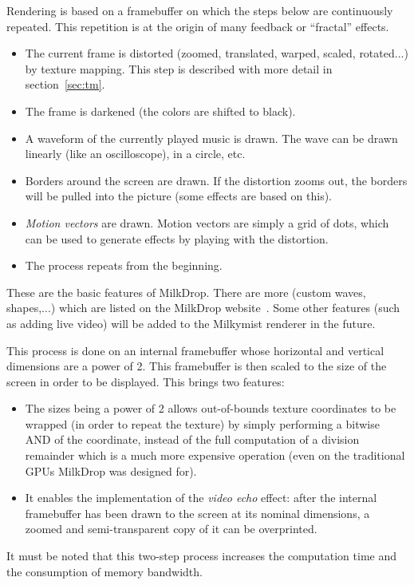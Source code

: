 \documentclass[a4paper,11pt]{kthesis}
\begin{document}
Rendering is based on a framebuffer on which the steps below are continuously repeated. This repetition is at the origin of many feedback or ``fractal'' effects.
\begin{itemize}
\item The current frame is distorted (zoomed, translated, warped, scaled, rotated...) by texture mapping. This step is described with more detail in section~\ref{sec:tm}.
\item The frame is darkened (the colors are shifted to black).
\item A waveform of the currently played music is drawn. The wave can be drawn linearly (like an oscilloscope), in a circle, etc.
\item Borders around the screen are drawn. If the distortion zooms out, the borders will be pulled into the picture (some effects are based on this).
\item \textit{Motion vectors} are drawn. Motion vectors are simply a grid of dots, which can be used to generate effects by playing with the distortion.
\item The process repeats from the beginning.
\end{itemize}

These are the basic features of MilkDrop. There are more (custom waves, shapes,...) which are listed on the MilkDrop website~\cite{milkdrop}. Some other features (such as adding live video) will be added to the Milkymist renderer in the future.

This process is done on an internal framebuffer whose horizontal and vertical dimensions are a power of 2. This framebuffer is then scaled to the size of the screen in order to be displayed. This brings two features:
\begin{itemize}
\item The sizes being a power of 2 allows out-of-bounds texture coordinates to be wrapped (in order to repeat the texture) by simply performing a bitwise AND of the coordinate, instead of the full computation of a division remainder which is a much more expensive operation (even on the traditional GPUs MilkDrop was designed for).
\item It enables the implementation of the \textit{video echo} effect: after the internal framebuffer has been drawn to the screen at its nominal dimensions, a zoomed and semi-transparent copy of it can be overprinted.
\end{itemize}
It must be noted that this two-step process increases the computation time and the consumption of memory bandwidth.
\end{document}
